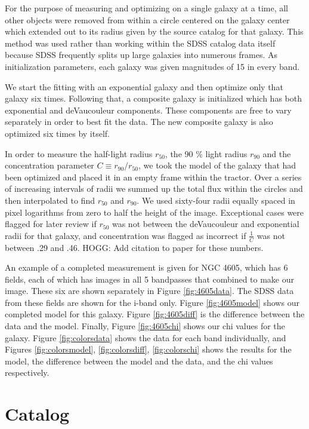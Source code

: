 \documentclass[12pt,preprint,pdftex]{aastex}
\newcommand{\rfifty}{r_{50}}
\newcommand{\rninety}{r_{90}}
\newcommand{\conc}{C}
\begin{document}
For the purpose of measuring and optimizing on a single galaxy at a
time, all other objects were removed from within a circle centered on
the galaxy center which extended out to its radius given by the source
catalog for that galaxy. This method was used rather than working within the
SDSS catalog data itself because SDSS frequently splits up large galaxies into
numerous frames. As initialization parameters, each galaxy was
given magnitudes of 15 in every band.

We start the fitting with an exponential galaxy and then optimize only
that galaxy six times. Following that, a composite galaxy is
initialized which has both exponential and deVaucouleur
components. These components are free to vary separately in order to
best fit the data. The new composite galaxy is also optimized six
times by itself.

In order to measure the half-light radius $\rfifty$, the 90 \% light
radius $\rninety$ and the concentration parameter $\conc\equiv
\rninety/\rfifty$, we took the model of the galaxy that had been
optimized and placed it in an empty frame within the tractor.
Over a series of increasing intervals of radii we summed up the total
flux within the circles and then interpolated to find $\rfifty$ and $\rninety$.
 We used sixty-four radii equally spaced in pixel logarithms from zero
 to half the height of the image. Exceptional cases were flagged for later
 review if $\rfifty$ was not between the deVaucouleur and exponential radii
 for that galaxy, and concentration was flagged as incorrect if $\frac{1}{\conc}$
 was not between .29 and .46. HOGG: Add citation to paper for these numbers.

An example of a completed measurement is given for NGC 4605, which has 6
fields, each of which has images in all 5 bandpasses that combined to make our image. These six are shown separately in Figure \ref{fig:4605data}. The SDSS data from these fields are shown
for the i-band only. Figure \ref{fig:4605model} shows our completed model for
this galaxy. Figure \ref{fig:4605diff} is the difference between the data
and the model. Finally, Figure \ref{fig:4605chi} shows our chi values for the
galaxy. Figure \ref{fig:colorsdata} shows the data for each
band individually, and Figures \ref{fig:colorsmodel}, \ref{fig:colorsdiff},
\ref{fig:colorschi} shows the results for the model, the difference
between the model and the data, and the chi values respectively.

\section{Catalog}
\end{document}
